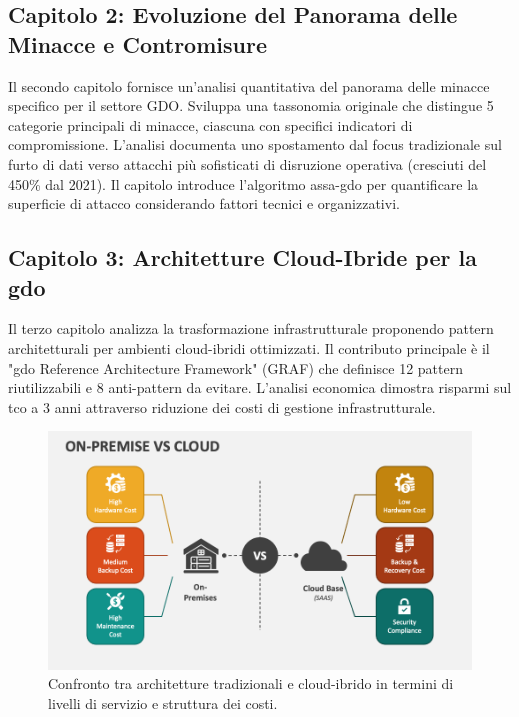 \subsection{\texorpdfstring{Capitolo 2: Evoluzione del Panorama delle Minacce e Contromisure}{1.6.1 - Capitolo 2: Evoluzione del Panorama delle Minacce e Contromisure}}
\label{subsec:struttura_cap2}

Il secondo capitolo fornisce un'analisi quantitativa del panorama delle minacce specifico per il settore GDO. Sviluppa una tassonomia originale che distingue 5 categorie principali di minacce, ciascuna con specifici indicatori di compromissione. L'analisi documenta uno spostamento dal focus tradizionale sul furto di dati verso attacchi più sofisticati di disruzione operativa (cresciuti del 450\% dal 2021). Il capitolo introduce l'algoritmo \gls{assa-gdo} per quantificare la superficie di attacco considerando fattori tecnici e organizzativi.

\subsection{\texorpdfstring{Capitolo 3: Architetture Cloud-Ibride per la \gls{gdo}}{1.6.2 - Capitolo 3: Architetture Cloud-Ibride per la GDO}}
\label{subsec:struttura_cap3}

Il terzo capitolo analizza la trasformazione infrastrutturale proponendo pattern architetturali per ambienti cloud-ibridi ottimizzati. Il contributo principale è il "\gls{gdo} Reference Architecture Framework" (GRAF) che definisce 12 pattern riutilizzabili e 8 anti-pattern da evitare. L'analisi economica dimostra risparmi sul \gls{tco} a 3 anni attraverso riduzione dei costi di gestione infrastrutturale.

\begin{figure}[H]
\centering
\includegraphics[width=\textwidth]{thesis_figures/cap1/on-premise-vs-cloud.png}
\caption{Confronto tra architetture tradizionali e cloud-ibrido in termini di livelli di servizio e struttura dei costi.}
\label{fig:on-premise-vs-cloud}
\end{figure}

